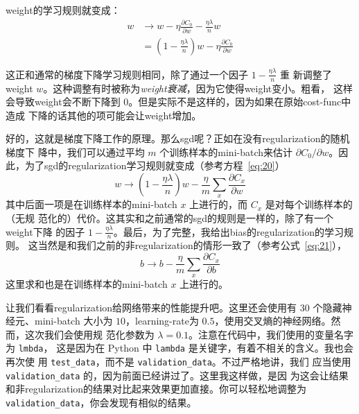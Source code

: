\gls*{weight}的学习规则就变成：
\begin{align}
  w & \rightarrow w-\eta \frac{\partial C_0}{\partial
      w}-\frac{\eta \lambda}{n} w \label{eq:91}\tag{91}\\
    & = \left(1-\frac{\eta \lambda}{n}\right) w -\eta \frac{\partial
      C_0}{\partial w} \label{eq:92}\tag{92}
\end{align}

这正和通常的梯度下降学习规则相同，除了通过一个因子 $1-\frac{\eta\lambda}{n}$ 重
新调整了\gls*{weight} $w$。这种调整有时被称为\emph{\gls*{weight}衰减}，因为它使得\gls*{weight}变小。粗看，
这样会导致\gls*{weight}会不断下降到 $0$。但是实际不是这样的，因为如果在原始\gls*{cost-func}中造成
下降的话其他的项可能会让\gls*{weight}增加。

好的，这就是梯度下降工作的原理。那么\gls*{sgd}呢？正如在没有\gls*{regularization}的随机梯度下
降中，我们可以通过平均 $m$ 个训练样本的\gls*{mini-batch}来估计 $\partial C_0/\partial
w$。因此，为了\gls*{sgd}的\gls*{regularization}学习规则就变成（参考方程~\eqref{eq:20}）
\begin{equation}
  w \rightarrow \left(1-\frac{\eta \lambda}{n}\right) w -\frac{\eta}{m}
  \sum_x \frac{\partial C_x}{\partial w}
  \label{eq:93}\tag{93}
\end{equation}
其中后面一项是在训练样本的\gls*{mini-batch} $x$ 上进行的，而 $C_x$ 是对每个训练样本的（无规
  范化的）代价。这其实和之前通常的\gls*{sgd}的规则是一样的，除了有一个\gls*{weight}下降
的因子 $1-\frac{\eta \lambda}{n}$。最后，为了完整，我给出\gls*{bias}的\gls*{regularization}的学习规则。
这当然是和我们之前的非\gls*{regularization}的情形一致了（参考公式~\eqref{eq:21}），
\begin{equation}
  b \rightarrow b - \frac{\eta}{m} \sum_x \frac{\partial C_x}{\partial b}
  \label{eq:94}\tag{94}
\end{equation}
这里求和也是在训练样本的\gls*{mini-batch} $x$ 上进行的。

让我们看看\gls*{regularization}给网络带来的性能提升吧。这里还会使用有 $30$ 个隐藏神经元、\gls*{mini-batch}
大小为 $10$，\gls*{learning-rate}为 $0.5$，使用交叉熵的神经网络。然而，这次我们会使用规
范化参数为 $\lambda = 0.1$。注意在代码中，我们使用的变量名字为 \lstinline!lmbda!，
这是因为在 Python 中 \lstinline!lambda! 是关键字，有着不相关的含义。我也会再次使
用 \lstinline!test_data!，而不是 \lstinline!validation_data!。不过严格地讲，我们
应当使用 \lstinline!validation_data! 的，因为前面已经讲过了。这里我这样做，是因
为这会让结果和非\gls*{regularization}的结果对比起来效果更加直接。你可以轻松地调整为
\lstinline!validation_data!，你会发现有相似的结果。

